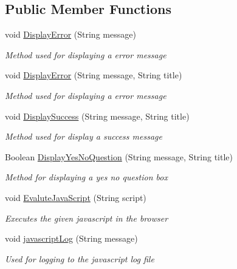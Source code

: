 \subsection*{Public Member Functions}
\begin{DoxyCompactItemize}
\item 
void \hyperlink{class_web_analyzer_1_1_u_i_1_1_interaction_objects_1_1_base_interaction_object_ab7fc25e42888acfba791389cbba16069}{Display\+Error} (String message)
\begin{DoxyCompactList}\small\item\em Method used for displaying a error message \end{DoxyCompactList}\item 
void \hyperlink{class_web_analyzer_1_1_u_i_1_1_interaction_objects_1_1_base_interaction_object_ae5aa6b0b986b2e3a47bf27a67eb79ca1}{Display\+Error} (String message, String title)
\begin{DoxyCompactList}\small\item\em Method used for displaying a error message \end{DoxyCompactList}\item 
void \hyperlink{class_web_analyzer_1_1_u_i_1_1_interaction_objects_1_1_base_interaction_object_a362619127fbab55c978fe11d1778f4ae}{Display\+Success} (String message, String title)
\begin{DoxyCompactList}\small\item\em Method used for display a success message \end{DoxyCompactList}\item 
Boolean \hyperlink{class_web_analyzer_1_1_u_i_1_1_interaction_objects_1_1_base_interaction_object_afea2b7dc8ced6dababfd23381af7485d}{Display\+Yes\+No\+Question} (String message, String title)
\begin{DoxyCompactList}\small\item\em Method for displaying a yes no question box \end{DoxyCompactList}\item 
void \hyperlink{class_web_analyzer_1_1_u_i_1_1_interaction_objects_1_1_base_interaction_object_af86a8726164ce830fa14f49160bb3f05}{Evalute\+Java\+Script} (String script)
\begin{DoxyCompactList}\small\item\em Executes the given javascript in the browser \end{DoxyCompactList}\item 
void \hyperlink{class_web_analyzer_1_1_u_i_1_1_interaction_objects_1_1_base_interaction_object_acec4cefdd4842652a61bc0cb62746a0d}{javascript\+Log} (String message)
\begin{DoxyCompactList}\small\item\em Used for logging to the javascript log file \end{DoxyCompactList}\end{DoxyCompactItemize}
